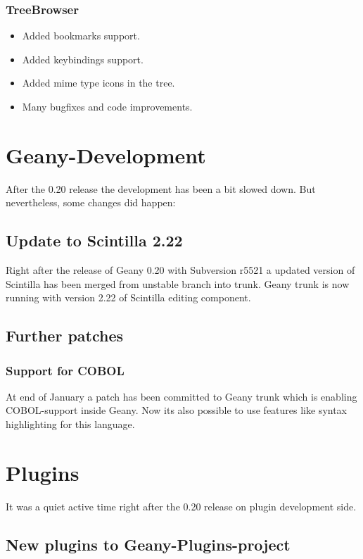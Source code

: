 \documentclass[%
paper=a4,%
fontsize=11pt,%
twoside=false,%
DIV18,
headsepline,
plainheadsepline,
footsepline,
plainfootsepline,
parskip=half,%
openany,%
]{scrartcl}
\begin{document}
\subsubsection{TreeBrowser}
\begin{itemize}
	\item Added bookmarks support.
	\item Added keybindings support.
	\item Added mime type icons in the tree.
	\item Many bugfixes and code improvements.
\end{itemize}

\section{Geany-Development}

After the 0.20 release the development has been a bit slowed down. But
nevertheless, some changes did happen:

\subsection{Update to Scintilla 2.22}

Right after the release of Geany 0.20 with Subversion r5521 a
updated version of Scintilla has been merged from unstable branch
into trunk. Geany trunk is now running with version 2.22 of
Scintilla editing component.

\subsection{Further patches}
\subsubsection{Support for COBOL}

At end of January a patch has been committed to Geany trunk which is
enabling COBOL-support inside Geany. Now its also possible to use
features like syntax highlighting for this language.


\section{Plugins}

It was a quiet active time right after the 0.20 release on plugin
development side.

\subsection{New plugins to Geany-Plugins-project}
\end{document}
